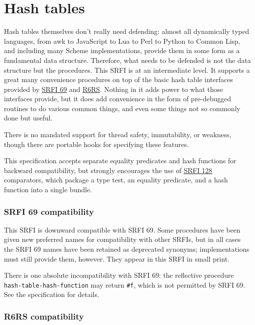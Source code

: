 \section{Hash tables}

Hash tables themselves don't really need defending: almost all
dynamically typed languages, from awk to JavaScript to Lua to Perl to
Python to Common Lisp, and including many Scheme implementations,
provide them in some form as a fundamental data structure. Therefore,
what needs to be defended is not the data structure but the procedures.
This SRFI is at an intermediate level. It supports a great many
convenience procedures on top of the basic hash table interfaces
provided by \href{http://srfi.schemers.org/srfi-69/srfi-69.html}{SRFI
69} and
\href{http://www.r6rs.org/final/html/r6rs-lib/r6rs-lib-Z-H-14.html}{R6RS}.
Nothing in it adds power to what those interfaces provide, but it does
add convenience in the form of pre-debugged routines to do various
common things, and even some things not so commonly done but useful.

There is no mandated support for thread safety, immutability, or
weakness, though there are portable hooks for specifying these features.

This specification accepts separate equality predicates and hash
functions for backward compatibility, but strongly encourages the use of
\href{http://srfi.schemers.org/srfi-128/srfi-128.html}{SRFI 128}
comparators, which package a type test, an equality predicate, and a
hash function into a single bundle.

\subsubsection{SRFI 69 compatibility}\label{SRFI69compatibility}

This SRFI is downward compatible with SRFI 69. Some procedures have been
given new preferred names for compatibility with other SRFIs, but in all
cases the SRFI 69 names have been retained as deprecated synonyms;
implementations must still provide them, however. They appear in this
SRFI in small print.

There is one absolute incompatibility with SRFI 69: the reflective
procedure \texttt{hash-table-hash-function} may return \texttt{\#f},
which is not permitted by SRFI 69. See the specification for details.

\subsubsection{R6RS compatibility}\label{R6RScompatibility}

